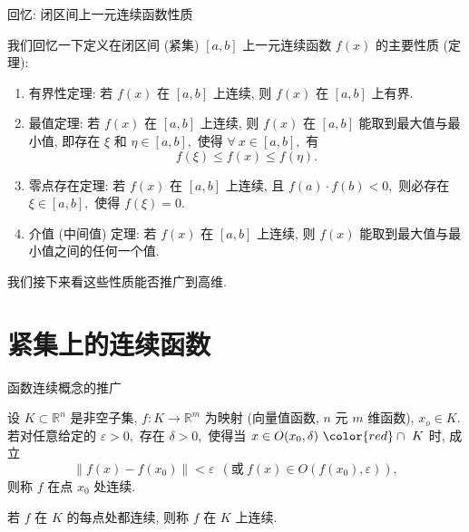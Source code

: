 \begin{frame}{回忆: 闭区间上一元连续函数性质}

我们回忆一下定义在闭区间 (紧集) $[a, b]$ 上一元连续函数 $f(x)$ 的主要性质 (定理):

\pause
\vspace{1em}

\begin{enumerate}[<+->]
\item 有界性定理: 若 $f(x)$ 在 $[a, b]$ 上连续, 则 $f(x)$ 在 $[a, b]$ 上有界.
\item 最值定理: 若 $f(x)$ 在 $[a, b]$ 上连续, 则 $f(x)$ 在 $[a, b]$ 能取到最大值与最小值, 即存在 $\xi$ 和 $\eta \in [a, b],$ 使得 $\forall~x \in [a, b],$ 有
\[f(\xi) \leqslant f(x) \leqslant f(\eta).\]
\item 零点存在定理: 若 $f(x)$ 在 $[a, b]$ 上连续, 且 $f(a) \cdot f(b) < 0,$ 则必存在 $\xi \in [a, b],$ 使得 $f(\xi) = 0.$
\item 介值 (中间值) 定理: 若 $f(x)$ 在 $[a, b]$ 上连续, 则 $f(x)$ 能取到最大值与最小值之间的任何一个值.
\end{enumerate}

\pause
\vspace{1em}

我们接下来看这些性质能否推广到高维.

\end{frame}


\section{紧集上的连续函数}


\begin{frame}{函数连续概念的推广}

\begin{Def}
设 $K\subset \mathbb{R}^n$ 是非空子集, $f: K \longrightarrow \mathbb{R}^m$ 为映射 (向量值函数, $n$ 元 $m$ 维函数), $x_o \in K.$ 若对任意给定的 $\varepsilon > 0,$ 存在 $\delta > 0,$ 使得当 $x \in O(x_0, \delta) ~ {\color{red} \cap ~ K}$ 时, 成立
\[\lVert f(x) - f(x_0) \rVert < \varepsilon ~~ (\text{或} ~ f(x) \in O(f(x_0), \varepsilon)),\]
则称 $f$ 在点 $x_0$ 处连续.

\pause

若 $f$ 在 $K$ 的每点处都连续, 则称 $f$ 在 $K$ 上连续.
\end{Def}

\end{frame}

